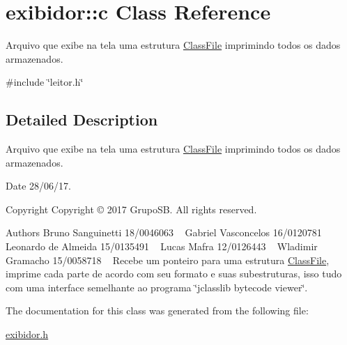 \hypertarget{classexibidor_1_1c}{}\section{exibidor\+:\+:c Class Reference}
\label{classexibidor_1_1c}


Arquivo que exibe na tela uma estrutura \hyperlink{structClassFile}{Class\+File} imprimindo todos os dados armazenados.  




{\ttfamily \#include \char`\"{}leitor.\+h\char`\"{}}



\subsection{Detailed Description}
Arquivo que exibe na tela uma estrutura \hyperlink{structClassFile}{Class\+File} imprimindo todos os dados armazenados. 

\begin{DoxyDate}{Date}
28/06/17. 
\end{DoxyDate}
\begin{DoxyCopyright}{Copyright}
Copyright © 2017 Grupo\+SB. All rights reserved.
\end{DoxyCopyright}
\begin{DoxyAuthor}{Authors}
Bruno Sanguinetti 18/0046063 ~\newline
Gabriel Vasconcelos 16/0120781 ~\newline
Leonardo de Almeida 15/0135491 ~\newline
Lucas Mafra 12/0126443 ~\newline
Wladimir Gramacho 15/0058718 ~\newline
 Recebe um ponteiro para uma estrutura \hyperlink{structClassFile}{Class\+File}, imprime cada parte de acordo com seu formato e suas subestruturas, isso tudo com uma interface semelhante ao programa \char`\"{}jclasslib bytecode viewer\char`\"{}. 
\end{DoxyAuthor}


The documentation for this class was generated from the following file\+:\begin{DoxyCompactItemize}
\item 
\hyperlink{exibidor_8h}{exibidor.\+h}\end{DoxyCompactItemize}
